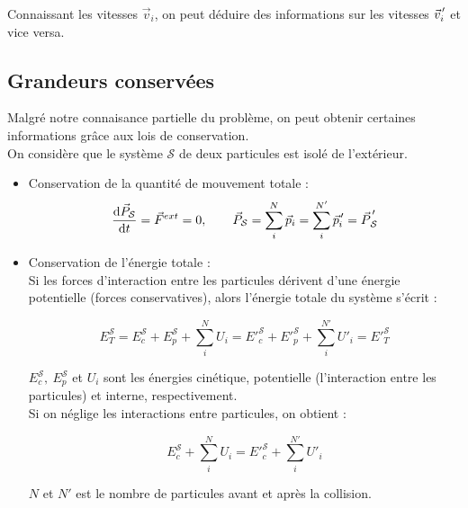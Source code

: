 \documentclass[12pt,a4paper,oneside,french]{book}
\newcommand{\diff}{\mathrm{d}}
\newcommand{\pvec}[1]{\vec{#1} \mkern2mu \vphantom{#1}}
\theoremstyle{definition}
\theoremstyle{definition}
\theoremstyle{definition}
\theoremstyle{remark}
\theoremstyle{definition}
\begin{document}
    Connaissant les vitesses ${\vec{v}}_{i}$, on peut déduire des informations sur les vitesses ${\pvec{v}}_{\! i}'$ et vice versa.
    
    \subsection{Grandeurs conservées}
    Malgré notre connaisance partielle du problème, on peut obtenir certaines informations grâce aux lois de conservation. \\
    
    On considère que le système $\mathcal{S}$ de deux particules est isolé de l'extérieur.
    
    \begin{itemize}
        \itemsep1em
        
        \item 
        Conservation de la quantité de mouvement totale :
        \begin{equation*}
            \frac{\diff {\vec{P}}_{\mathcal{S}}}{\diff t} = {\vec{F}}^{ext} = 0, \qquad {\vec{P}}_{\mathcal{S}} = \sum_{i}^{N} {\vec{p}}_{i} = \sum_{i}^{N'} {\pvec{p}}_{\! i}' = {\pvec{P}}_{\! \mathcal{S}}'
        \end{equation*}
        
        \item
        Conservation de l'énergie totale : \\
        
        Si les forces d'interaction entre les particules dérivent d'une énergie potentielle (forces conservatives), alors l'énergie totale du système s'écrit :
        
        \begin{equation*}
            {E}_{T}^{\mathcal{S}} = {E}_{c}^{\mathcal{S}} + {E}_{p}^{\mathcal{S}} + \sum_{i}^{N} {U}_{i} = {E'}_{\!\! c}^{\mathcal{S}} + {E'}_{\!\! p}^{\mathcal{S}} + \sum_{i}^{N'} {U'}_{\!\! i} = {E'}_{\!\! T}^{\mathcal{S}}
        \end{equation*}
        
        ${E}_{c}^{\mathcal{S}}, \ {E}_{p}^{\mathcal{S}}$ et ${U}_{i}$ sont les énergies cinétique, potentielle (l'interaction entre les particules) et interne, respectivement. \\
        
        Si on néglige les interactions entre particules, on obtient :
        
        \begin{equation*}
            {E}_{c}^{\mathcal{S}} + \sum_{i}^{N} {U}_{i} = {E'}_{\!\! c}^{\mathcal{S}} + \sum_{i}^{N'} {U'}_{\!\! i}
        \end{equation*}
        
        $N$ et $N'$ est le nombre de particules avant et après la collision.
    \end{itemize}
    
\end{document}

